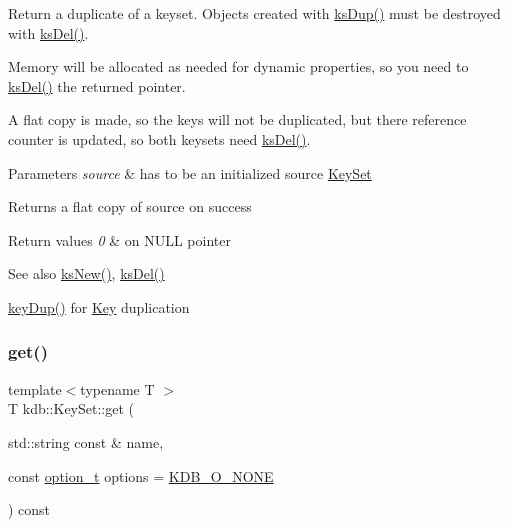 Return a duplicate of a keyset. Objects created with \hyperlink{group__keyset_gac59e4b328245463f1451f68d5106151c}{ks\+Dup()} must be destroyed with \hyperlink{group__keyset_ga27e5c16473b02a422238c8d970db7ac8}{ks\+Del()}.

Memory will be allocated as needed for dynamic properties, so you need to \hyperlink{group__keyset_ga27e5c16473b02a422238c8d970db7ac8}{ks\+Del()} the returned pointer.

A flat copy is made, so the keys will not be duplicated, but there reference counter is updated, so both keysets need \hyperlink{group__keyset_ga27e5c16473b02a422238c8d970db7ac8}{ks\+Del()}.


\begin{DoxyParams}{Parameters}
{\em source} & has to be an initialized source \hyperlink{classkdb_1_1KeySet}{Key\+Set} \\
\hline
\end{DoxyParams}
\begin{DoxyReturn}{Returns}
a flat copy of source on success 
\end{DoxyReturn}

\begin{DoxyRetVals}{Return values}
{\em 0} & on N\+U\+LL pointer \\
\hline
\end{DoxyRetVals}
\begin{DoxySeeAlso}{See also}
\hyperlink{group__keyset_ga671e1aaee3ae9dc13b4834a4ddbd2c3c}{ks\+New()}, \hyperlink{group__keyset_ga27e5c16473b02a422238c8d970db7ac8}{ks\+Del()} 

\hyperlink{group__key_gae6ec6a60cc4b8c1463fa08623d056ce3}{key\+Dup()} for \hyperlink{group__key}{Key} duplication 
\end{DoxySeeAlso}
\mbox{\label{classkdb_1_1KeySet_ad0b7d6498cf0b51ca6672704939a7f24}} 
\subsubsection{\texorpdfstring{get()}{get()}}
{\footnotesize\ttfamily template$<$typename T $>$ \\
T kdb\+::\+Key\+Set\+::get (\begin{DoxyParamCaption}\item[{std\+::string const \&}]{name,  }\item[{const \hyperlink{group__keyset_ga98a3d6a4016c9dad9cbd1a99a9c2a45a}{option\+\_\+t}}]{options = {\ttfamily \hyperlink{group__keyset_gga98a3d6a4016c9dad9cbd1a99a9c2a45aa00738455e0ae843c8720809d8287f370}{K\+D\+B\+\_\+\+O\+\_\+\+N\+O\+NE}} }\end{DoxyParamCaption}) const\hspace{0.3cm}{\ttfamily [inline]}}



